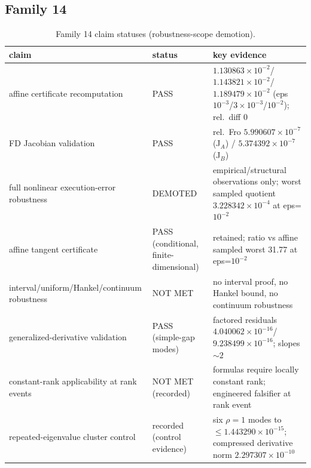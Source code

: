 \documentclass[12pt]{article}
\begin{document}
\subsection{Family 14}
\begin{table}[ht]
\centering
\small
\caption{Family 14 claim statuses (robustness-scope demotion).}
\label{app:tab:f14}
\begin{tabular}{p{} p{} p{}}
\toprule
claim & status & key evidence \\
\midrule
affine certificate recomputation & PASS &
$1.130863\times10^{-2}$/ $1.143821\times10^{-2}$/ $1.189479\times10^{-2}$
(eps $10^{-3}$/$3\times10^{-3}$/$10^{-2}$); rel.\ diff 0 \\
FD Jacobian validation & PASS &
rel.\ Fro $5.990607\times10^{-7}$ (J$_A$) / $5.374392\times10^{-7}$ (J$_B$) \\
full nonlinear execution-error robustness & DEMOTED &
empirical/structural observations only; worst sampled quotient
$3.228342\times10^{-4}$ at eps=$10^{-2}$ \\
affine tangent certificate & PASS (conditional, finite-dimensional) &
retained; ratio vs affine sampled worst 31.77 at eps=$10^{-2}$ \\
interval/uniform/Hankel/continuum robustness & NOT MET &
no interval proof, no Hankel bound, no continuum robustness \\
generalized-derivative validation & PASS (simple-gap modes) &
factored residuals $4.040062\times10^{-16}$/ $9.238499\times10^{-16}$;
slopes $\sim2$ \\
constant-rank applicability at rank events & NOT MET (recorded) &
formulas require locally constant rank; engineered falsifier at rank event \\
repeated-eigenvalue cluster control & recorded (control evidence) &
six $\rho=1$ modes to $\le1.443290\times10^{-15}$; compressed derivative norm
$2.297307\times10^{-10}$ \\
\bottomrule
\end{tabular}
\end{table}
\end{document}
